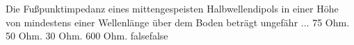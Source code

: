     {Die Fußpunktimpedanz eines mittengespeisten Halbwellendipols in einer Höhe von mindestens einer Wellenlänge über dem Boden beträgt ungefähr ...}
    {75 Ohm.}
    {50 Ohm.}
    {30 Ohm.}
    {600 Ohm.}
    {false}{false}